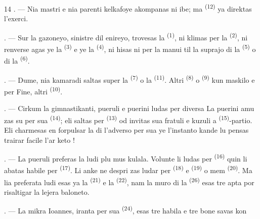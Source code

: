 \begin{VUpage}[16]{14}
. --- Nia mastri e nia parenti kelkafoye\nl
akompanas ni ibe; ma \cc
{}\textsuperscript{(12)} ya direktas l'exerci.

. --- Sur la gazoneyo, sinistre dil enireyo,\nl
trovesas la \textsuperscript{(1)}, ni klimas\nl
per la \textsuperscript{(2)}, ni renverse agas ye la \textsuperscript{(3)}\nl
e ye la \textsuperscript{(4)}, ni hisas ni per la manui\nl
til la suprajo di la \textsuperscript{(5)} o di la\nl
{}\textsuperscript{(6)}.

. --- Dume, nia kamaradi saltas super la\nl
{}\textsuperscript{(7)} o la \textsuperscript{(11)}. Altri\nl
{}\textsuperscript{(8)} o \textsuperscript{(9)} kun maskilo e per \cc
{} Fine, altri \textsuperscript{(10)}.

\VUsaut{4.6mm}
\VUsaut{3.0mm}

. --- Cirkum la gimnastikanti, pueruli e\nl
puerini ludas per diversa  La puerini amu\cc
zas su per sua \textsuperscript{(14)}; eli saltas per \cc
{}\textsuperscript{(13)} od invitas sua fratuli e kuzuli a \cc
{}\textsuperscript{(15)}-partio. Eli charmesas en forpulsar la\nl
{} di l'adverso per sua  ye\nl
l'instanto kande lu pensas trairar facile l'ar\cc
keto !

. --- La pueruli preferas la ludi plu mus\cc
kulala. Volunte li ludas per \textsuperscript{(16)} quin li\nl
abatas habile per \textsuperscript{(17)}. Li anke ne despri\cc
zas ludar per \textsuperscript{(18)} e \textsuperscript{(19)} o mem\nl
{}\textsuperscript{(20)}. Ma lia preferata ludi esas ya la\nl
{}\textsuperscript{(21)} e la \textsuperscript{(22)}, nam la muro\nl
di la \textsuperscript{(26)} esas tre apta por risaltigar la\nl
lejera baloneto.

. --- La mikra Ioannes, iranta per sua\nl
{}\textsuperscript{(24)}, esas tre habila e tre bone savas kon\cc
\parplein
\end{VUpage}

